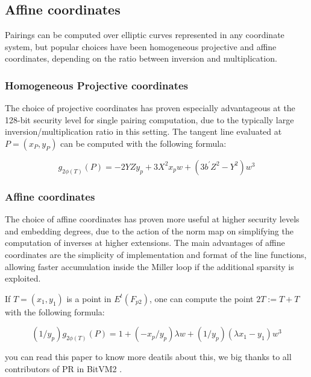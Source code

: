 \subsection{Affine coordinates}

Pairings can be computed over elliptic curves represented in any coordinate system, but popular choices have been homogeneous projective and affine coordinates, depending on the ratio between inversion and multiplication.

\subsubsection{Homogeneous Projective coordinates} 
The choice of projective coordinates has proven especially advantageous at the 128-bit security level for single pairing
computation, due to the typically large inversion/multiplication ratio in this setting. The tangent line evaluated at
$ P = (x_P , y_P)$ can be computed with the following formula:

\begin{equation}
    g_{2\phi(T)}(P) = -2YZy_p + 3X^2x_pw + (3b^{'}Z^2 - Y^2)w^3
\end{equation}

\subsubsection{Affine coordinates} 

The choice of affine coordinates has proven more useful at higher security levels and embedding degrees, due to the action of the norm
map on simplifying the computation of inverses at higher extensions. The main advantages of affine coordinates are the simplicity of implementation and
format of the line functions, allowing faster accumulation inside the Miller loop if the additional sparsity is exploited.

If $ T = (x_1, y_1)$ is a point in $E^t(F_{p2})$, one can compute the point $ 2T := T + T $ with the following formula:

\begin{equation}
    (1 / y_p)g_{2\phi(T)}(P) = 1 + (-x_p/y_p)\lambda w + (1 / y_p)(\lambda x_1 - y_1)w^3
\end{equation}

you can read this paper \cite{website:The-realm-of-the-pairings} to know more deatils about this, we big thanks to all contributors of 
PR \cite{website:PR} in BitVM2 \cite{website:BitVM2}.
